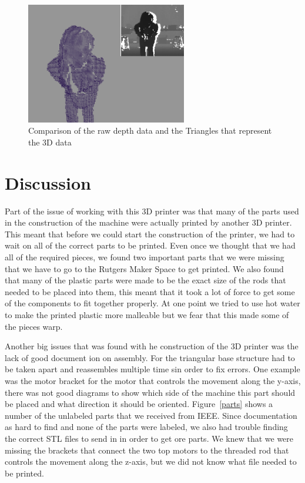 \documentclass[pdftex,10.5pt]{report}
\begin{document}
\begin{figure}[H]
	\centering
	\includegraphics[width=70mm]{figures/cadyholdingball2.png}
	\caption{Comparison of the raw depth data and the Triangles that represent the 3D data}
	\label{balls2}
\end{figure}

\section{Discussion}
Part of the issue of working with this 3D printer was that many of the parts used in the construction of the machine were actually printed by another 3D printer. This meant that before we could start the construction of the printer, we had to wait on all of the correct parts to be printed. Even once we thought that we had all of the required pieces, we found two important parts that we were missing that we have to go to the Rutgers Maker Space to get printed. We also found that many of the plastic parts were made to be the exact size of the rods that needed to be placed into them, this meant that it took a lot of force to get some of the components to fit together properly. At one point we tried to use hot water to make the printed plastic more malleable but we fear that this made some of the pieces warp.

Another big issues that was found with he construction of the 3D printer was the lack of good document ion on assembly. For the triangular base structure had to be taken apart and reassembles multiple time sin order to fix errors. One example was the motor bracket for the motor that controls the movement along the y-axis, there was not good diagrams to show which side of the machine this part should be placed and what direction it should be oriented. Figure~\ref{parts} shows a number of the unlabeled parts that we received from IEEE. Since documentation as hard to find and none of the parts were labeled, we also had trouble finding the correct STL files to send in in order to get ore parts. We knew that we were missing the brackets that connect the two top motors to the threaded rod that controls the movement along the z-axis, but we did not know what file needed to be printed.
\end{document}
